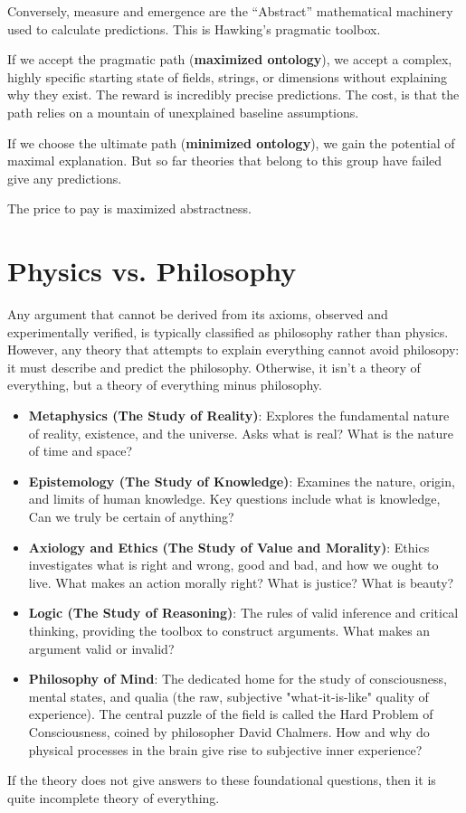 Conversely, measure and emergence are the ``Abstract'' mathematical machinery used to calculate predictions. This is Hawking's pragmatic toolbox.

If we accept the pragmatic path (\textbf{maximized ontology}), we accept a complex, highly specific starting state of fields, strings, or dimensions without explaining why they exist.
The reward is incredibly precise predictions.
The cost, is that the path relies on a mountain of unexplained baseline assumptions.

If we choose the ultimate path (\textbf{minimized ontology}), we gain the potential of maximal explanation.
But so far theories that belong to this group have failed give any predictions.

The price to pay is maximized abstractness.


\section{Physics vs. Philosophy}

Any argument that cannot be derived from its axioms, observed and experimentally verified, 
is typically classified as philosophy rather than physics. However, any theory that attempts to explain everything cannot avoid philosopy:
it must describe and predict the philosophy. Otherwise, it isn't a theory of everything, but a theory of everything minus philosophy.


\begin{itemize}
  
\item \textbf{Metaphysics (The Study of Reality)}: Explores the fundamental nature of reality, existence, and the universe. Asks what is real? What is the nature of time and space? 

\item \textbf{Epistemology (The Study of Knowledge)}: Examines the nature, origin, and limits of human knowledge. Key questions include what is knowledge,
  Can we truly be certain of anything?

\item \textbf{Axiology and Ethics (The Study of Value and Morality)}: Ethics investigates what is right and wrong, good and bad, and how we ought to live.
  What makes an action morally right? What is justice? What is beauty?

\item \textbf{Logic (The Study of Reasoning)}: The rules of valid inference and critical thinking, providing the toolbox to construct arguments. What makes an argument valid or invalid? 

\item \textbf{Philosophy of Mind}: The dedicated home for the study of consciousness, mental states, and qualia (the raw, subjective "what-it-is-like" quality of experience).
The central puzzle of the field is called the Hard Problem of Consciousness, coined by philosopher David Chalmers. 
How and why do physical processes in the brain give rise to subjective inner experience?
    
\end{itemize}

If the theory does not give answers to these foundational questions, then it is quite incomplete theory of everything.


